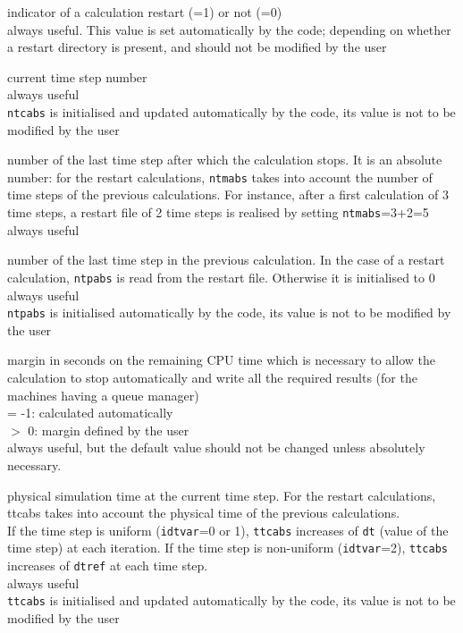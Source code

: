 {indicator of a calculation restart (=1) or not (=0)\\
always useful. This value is set automatically by the code; depending on
whether a restart directory is present, and should not be modified by
the user}

{current time step number\\
always useful\\
{\tt ntcabs} is initialised and updated automatically by the code,
its value is not to be modified by the user}

{number of the last time step after which the calculation stops. It is
an absolute number: for the restart calculations, {\tt ntmabs} takes into
account the number of time steps of the previous calculations. For
instance, after a first calculation of 3 time steps, a restart file of 2
time steps is realised by setting {\tt ntmabs}=3+2=5\\
always useful}

{number of the last time step in the previous calculation. In the case of
a restart calculation, {\tt ntpabs} is read from the restart file. Otherwise
it is initialised to 0\\
always useful\\
{\tt ntpabs} is initialised automatically by the code, its value is not to
be modified by the user}

{margin in seconds on the remaining CPU time which is necessary to allow
the calculation to stop automatically and write all the required results
(for the machines having a queue manager)\\
\hspace*{1.3cm}= -1: calculated automatically\\
\hspace*{1.3cm}$>$ 0: margin defined by the user\\
always useful, but the default value should not be changed
unless absolutely necessary.}


{physical simulation time at the current time step. For the restart
calculations, \mbox{ttcabs} takes into account the physical time of the
previous calculations.\\
If the time step is uniform ({\tt idtvar}=0 or 1), {\tt ttcabs} increases
of {\tt dt} (value of the time step) at each iteration. If the time step is
non-uniform ({\tt idtvar}=2),
{\tt ttcabs} increases of {\tt dtref} at each time step.\\
always useful\\
{\tt ttcabs} is initialised and updated automatically by the code,
its value is not to be modified by the user}

